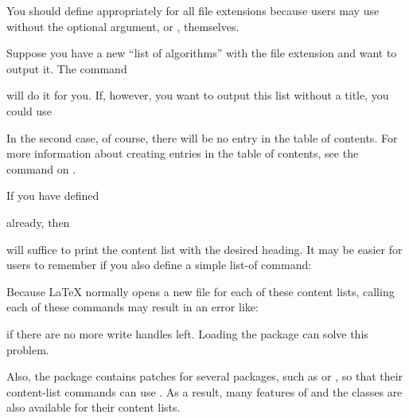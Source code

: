 You should define 
appropriately for all file extensions because users may use 
without the optional argument, or , themselves.
\begin{Example}
 Suppose you have a new ``list of algorithms'' with the file extension
  and want to output it. The command
\begin{lstcode}
\end{lstcode}
  will do it for you. If, however, you want to output this list without a
  title, you could use
\begin{lstcode}
\end{lstcode}
  In the second case, of course, there will be no entry in the table of
  contents. For more information about creating entries in the table of
  contents, see the  command on
  .

  If you have defined
\begin{lstcode}
  \newcommand*{\listofloaname}{%
    List of Algorithms%
  }
\end{lstcode}
  already, then
\begin{lstcode}
\end{lstcode}
  will suffice to print the content list with the desired heading. It may be
  easier for users to remember if you also define a simple list-of command:
\begin{lstcode}
  \newcommand*{\listofalgorithms}{\listoftoc{loa}}
\end{lstcode}
\end{Example}

Because \LaTeX{} normally opens a new file for each of
these content lists, calling each of these commands may
result in an error like:
if there are no more write handles left. Loading the
package \cite{package:scrwfile} can solve this problem.

Also, the \hyperref[cha:scrhack]{}%
 package contains patches
for several packages, such as  or
, so that their content-list commands
can use . As a result, many features of 
and the \KOMAScript{} classes are also available for their content lists.%
\EndIndexGroup


